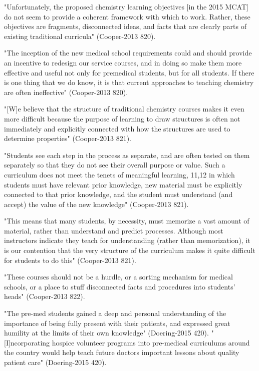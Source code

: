 "Unfortunately, the proposed chemistry learning objectives [in the 2015 MCAT] do not seem to provide a coherent framework with which to work. Rather, these objectives are fragments, disconnected ideas, and facts that are clearly parts of existing traditional curricula" (Cooper-2013 820).

"The inception of the new medical school requirements could and should provide an incentive to redesign our service courses, and in doing so make them more effective and usefulnot only for premedical students, but for all students. If there is one thing that we do know, it is that current approaches to teaching chemistry are often ineffective" (Cooper-2013 820).

"[W]e believe that the structure of traditional chemistry courses makes it even more difficult because the purpose of learning to draw structures is often not immediately and explicitly connected with how the structures are used to determine properties" (Cooper-2013 821).

"Students see each step in the process as separate, and are often tested on them separately so that they do not see their overall purpose or value. Such a curriculum does not meet the tenets of meaningful learning, 11,12 in which students must have relevant prior knowledge, new material must be explicitly connected to that prior knowledge, and the student must understand (and accept) the value of the new knowledge" (Cooper-2013 821).

"This means that many students, by necessity, must memorize a vast amount of material, rather than understand and predict processes. Although most instructors indicate they teach for understanding (rather than memorization), it is our contention that the very structure of the curriculum makes it quite difficult for students to do this" (Cooper-2013 821).

"These courses should not be a hurdle, or a sorting mechanism for medical schools, or a place to stuff disconnected facts and procedures into students’ heads" (Cooper-2013 822).


"The pre-med students gained a deep and
personal understanding of the importance of being fully present with their patients, and expressed great humility at the limits of their own knowledge" (Doering-2015 420).
"[I]ncorporating hospice volunteer programs into pre-medical curriculums around the country would help teach future doctors important lessons about quality patient care" (Doering-2015 420).

